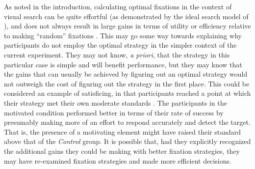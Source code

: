 \documentclass[vision,article,submit,moreauthors,pdftex,10pt,a4paper]{mdpi}
\begin{document}
As noted in the introduction, calculating optimal fixations in the context of visual search can be quite effortful (as demonstrated by the ideal search model of \citeauthor{najemnik2005optimal} \cite{najemnik2005optimal}), and does not always result in large gains in terms of utility or efficiency relative to making “random” fixations \cite{clarke2016stocha}. This may go some way towards explaining why participants do not employ the optimal strategy in the simpler context of the current experiment. They may not know, \textit{a priori}, that the strategy in this particular case is simple and will benefit performance, but they may know that  the gains that can usually be achieved by figuring out an optimal strategy would not outweigh the cost of figuring out the strategy in the first place. This could be considered an example of satisficing, in that participants reached a point at which their strategy met their own moderate standards \cite{simon1990invariants}. The participants in the motivated condition performed better in terms of their rate of success by presumably making more of an effort to respond accurately and detect the target. That is, the presence of a motivating element might have raised their standard above that of the \textit{Control} group. It is possible that, had they explicitly recognized the additional gains they could be making with better fixation strategies, they may have re-examined fixation strategies and made more efficient decisions.
\end{document}
